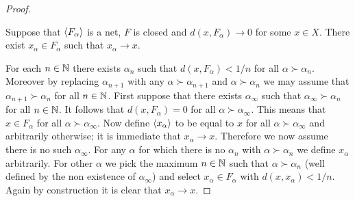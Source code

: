 \begin{proof}
\begin{clm}Suppose that $\langle F_{\alpha} \rangle$ is a net, $F$ is closed and $d(x,F_\alpha) \to 0$ for some $x \in X$.  There exist $x_\alpha \in F_\alpha$ such that $x_\alpha \to x$.
\end{clm}
For each $n \in \mathbb{N}$ there exists $\alpha_n$ such that $d(x,F_\alpha) < 1/n$ for all $\alpha \succ \alpha_n$.  Moreover by replacing $\alpha_{n+1}$ with any $\alpha \succ \alpha_{n+1}$ and $\alpha \succ \alpha_{n}$ we may assume that $\alpha_{n+1} \succ \alpha_n$ for all $n \in \mathbb{N}$.  First suppose that there exists $\alpha_\infty$ such that $\alpha_\infty \succ \alpha_n$ for all $n \in \mathbb{N}$.  It follows that $d(x,F_{\alpha}) = 0$ for all $\alpha \succ \alpha_\infty$.  This means that $x \in F_{\alpha}$ for all $\alpha \succ \alpha_\infty$.  Now define $\langle x_{\alpha} \rangle$ to be equal to $x$ for all $\alpha \succ \alpha_\infty$ and arbitrarily otherwise; it is immediate that $x_\alpha \to x$.  Therefore we now assume there is no such $\alpha_\infty$.  For any $\alpha$ for which there is no $\alpha_n$ with $\alpha \succ \alpha_n$ we define $x_\alpha$ arbitrarily.  For other $\alpha$ we pick the maximum $n \in \mathbb{N}$ such that $\alpha \succ \alpha_n$ (well defined by the non existence of $\alpha_\infty$) and select $x_\alpha \in F_\alpha$ with $d(x,x_\alpha) < 1/n$.  Again by construction it is clear that $x_\alpha \to x$.


\end{proof}
